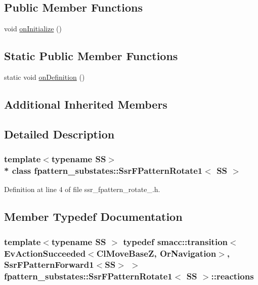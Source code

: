 \subsection*{Public Member Functions}
\begin{DoxyCompactItemize}
\item 
void \hyperlink{structfpattern__substates_1_1SsrFPatternRotate1_abdd10e56b1e0c3a008a54ec4afbaa61d}{on\+Initialize} ()
\end{DoxyCompactItemize}
\subsection*{Static Public Member Functions}
\begin{DoxyCompactItemize}
\item 
static void \hyperlink{structfpattern__substates_1_1SsrFPatternRotate1_a042018fcfa8ac8841183b64c89df3c28}{on\+Definition} ()
\end{DoxyCompactItemize}
\subsection*{Additional Inherited Members}


\subsection{Detailed Description}
\subsubsection*{template$<$typename SS$>$\\*
class fpattern\+\_\+substates\+::\+Ssr\+F\+Pattern\+Rotate1$<$ S\+S $>$}



Definition at line 4 of file ssr\+\_\+fpattern\+\_\+rotate\+\_.\+h.



\subsection{Member Typedef Documentation}
\subsubsection[{\texorpdfstring{reactions}{reactions}}]{\setlength{\rightskip}{0pt plus 5cm}template$<$typename SS $>$ typedef {\bf smacc\+::transition}$<$Ev\+Action\+Succeeded$<$Cl\+Move\+BaseZ, Or\+Navigation$>$, {\bf Ssr\+F\+Pattern\+Forward1}$<$SS$>$ $>$ {\bf fpattern\+\_\+substates\+::\+Ssr\+F\+Pattern\+Rotate1}$<$ SS $>$\+::{\bf reactions}}\hypertarget{structfpattern__substates_1_1SsrFPatternRotate1_a85f5bc7fd526d762ef63300b35d4b890}{}\label{structfpattern__substates_1_1SsrFPatternRotate1_a85f5bc7fd526d762ef63300b35d4b890}


